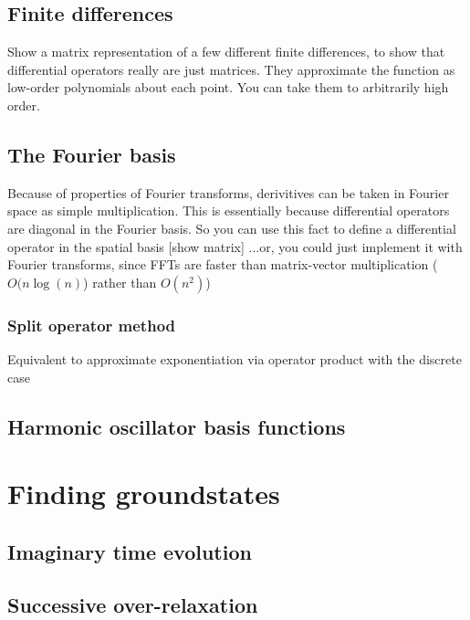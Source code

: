     \subsection{Finite differences}
        Show a matrix representation of a few different finite differences, to show that differential operators really are just matrices. They approximate the function as low-order polynomials about each point. You can take them to arbitrarily high order.
    \subsection{The Fourier basis}
        Because of properties of Fourier transforms, derivitives can be taken in Fourier space as simple multiplication. This is essentially because differential operators are diagonal in the Fourier basis. So you can use this fact to define a differential operator in the spatial basis [show matrix] ...or, you could just implement it with Fourier transforms, since FFTs are faster than matrix-vector multiplication ($O(n \log (n)$) rather than $O(n^2)$)
        \subsubsection{Split operator method}
            \itemize \item Equivalent to approximate exponentiation via operator product with the discrete case
    \subsection{Harmonic oscillator basis functions}

\section{Finding groundstates}
\subsection{Imaginary time evolution}
\subsection{Successive over-relaxation}
